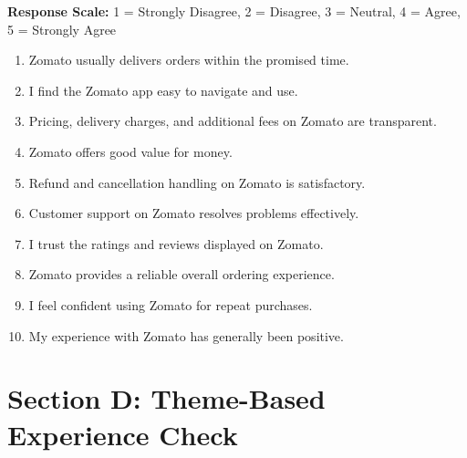 \textbf{Response Scale:} 1 = Strongly Disagree, 2 = Disagree, 3 = Neutral, 4 = Agree, 5 = Strongly Agree

\begin{enumerate}[resume,label=\textbf{Q\arabic*.}]
    \item Zomato usually delivers orders within the promised time.
    \item I find the Zomato app easy to navigate and use.
    \item Pricing, delivery charges, and additional fees on Zomato are transparent.
    \item Zomato offers good value for money.
    \item Refund and cancellation handling on Zomato is satisfactory.
    \item Customer support on Zomato resolves problems effectively.
    \item I trust the ratings and reviews displayed on Zomato.
    \item Zomato provides a reliable overall ordering experience.
    \item I feel confident using Zomato for repeat purchases.
    \item My experience with Zomato has generally been positive.
\end{enumerate}

\section*{Section D: Theme-Based Experience Check}

